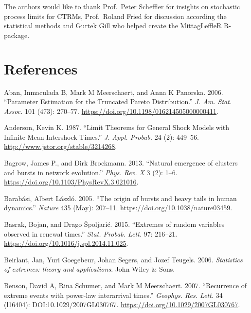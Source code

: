 \documentclass[]{elsarticle} %
\begin{document}
The authors would like to thank Prof.~Peter Scheffler for insights on
stochastic process limits for CTRMs, Prof.~Roland Fried for discussion
according the statistical methods and Gurtek Gill who helped create the
MittagLeffleR R-package.

\newpage

\hypertarget{references}{%
\section*{References}\label{references}}

\hypertarget{refs}{}
\leavevmode\hypertarget{ref-Aban06}{}%
Aban, Inmaculada B, Mark M Meerschaert, and Anna K Panorska. 2006.
``Parameter Estimation for the Truncated Pareto Distribution.'' \emph{J.
Am. Stat. Assoc.} 101 (473): 270--77.
\url{https://doi.org/10.1198/016214505000000411}.

\leavevmode\hypertarget{ref-Anderson1987}{}%
Anderson, Kevin K. 1987. ``Limit Theorems for General Shock Models with
Infinite Mean Intershock Times.'' \emph{J. Appl. Probab.} 24 (2):
449--56. \url{http://www.jstor.org/stable/3214268}.

\leavevmode\hypertarget{ref-Bagrow2013}{}%
Bagrow, James P., and Dirk Brockmann. 2013. ``Natural emergence of
clusters and bursts in network evolution.'' \emph{Phys. Rev. X} 3 (2):
1--6. \url{https://doi.org/10.1103/PhysRevX.3.021016}.

\leavevmode\hypertarget{ref-Barabasi2005}{}%
Barabási, Albert László. 2005. ``The origin of bursts and heavy tails in
human dynamics.'' \emph{Nature} 435 (May): 207--11.
\url{https://doi.org/10.1038/nature03459}.

\leavevmode\hypertarget{ref-Basrak2014}{}%
Basrak, Bojan, and Drago Špoljarić. 2015. ``Extremes of random variables
observed in renewal times.'' \emph{Stat. Probab. Lett.} 97: 216--21.
\url{https://doi.org/10.1016/j.spl.2014.11.025}.

\leavevmode\hypertarget{ref-beirlantBook}{}%
Beirlant, Jan, Yuri Goegebeur, Johan Segers, and Jozef Teugels. 2006.
\emph{Statistics of extremes: theory and applications}. John Wiley \&
Sons.

\leavevmode\hypertarget{ref-Benson2007}{}%
Benson, David A, Rina Schumer, and Mark M Meerschaert. 2007.
``Recurrence of extreme events with power-law interarrival times.''
\emph{Geophys. Res. Lett.} 34 (l16404): DOI:10.1029/2007GL030767.
\url{https://doi.org/10.1029/2007GL030767}.
\end{document}
